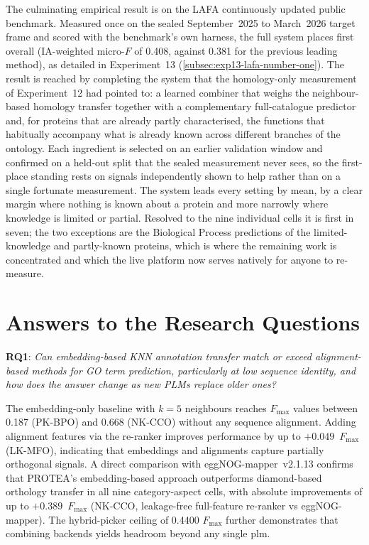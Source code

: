 The culminating empirical result is on the LAFA continuously updated public
benchmark. Measured once on the sealed September~2025 to March~2026 target frame
and scored with the benchmark's own harness, the full system places first overall
(IA-weighted micro-$F$ of 0.408, against 0.381 for the previous leading method),
as detailed in Experiment~13 (\cref{subsec:exp13-lafa-number-one}). The result is
reached by completing the system that the homology-only measurement of
Experiment~12 had pointed to: a learned combiner that weighs the neighbour-based
homology transfer together with a complementary full-catalogue predictor and, for
proteins that are already partly characterised, the functions that habitually
accompany what is already known across different branches of the ontology. Each
ingredient is selected on an earlier validation window and confirmed on a held-out
split that the sealed measurement never sees, so the first-place standing rests on
signals independently shown to help rather than on a single fortunate measurement.
The system leads every setting by mean, by a clear margin where nothing is known
about a protein and more narrowly where knowledge is limited or partial. Resolved
to the nine individual cells it is first in seven; the two exceptions are the
Biological Process predictions of the limited-knowledge and partly-known proteins,
which is where the remaining work is concentrated and which the live platform now
serves natively for anyone to re-measure.

\section{Answers to the Research Questions}
\label{sec:conclusion-rq}

\textbf{RQ1}: \emph{Can embedding-based KNN annotation transfer match or
exceed alignment-based methods for GO term prediction, particularly at low
sequence identity, and how does the answer change as new PLMs replace older
ones?}

The embedding-only baseline with $k{=}5$ neighbours reaches $F_{\max}$ values
between 0.187 (PK-BPO) and 0.668 (NK-CCO) without any sequence alignment.
Adding alignment features via the re-ranker improves performance by up to
$+0.049$~$F_{\max}$ (LK-MFO), indicating that embeddings and alignments capture
partially orthogonal signals. A direct comparison with eggNOG-mapper~v2.1.13
confirms that PROTEA's embedding-based approach outperforms \gls{diamond}-based
orthology transfer in all nine category-aspect cells, with absolute
improvements of up to $+0.389$~$F_{\max}$ (NK-CCO, leakage-free full-feature
re-ranker vs eggNOG-mapper). The hybrid-picker ceiling
of 0.4400 $F_{\max}$ further demonstrates that combining backends yields
headroom beyond any single \gls{plm}.

